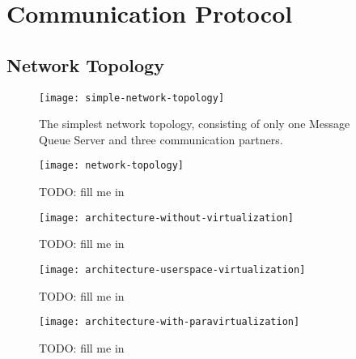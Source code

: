 \chapter{Communication Protocol}
\label{cha:comm-prot}

\section{Network Topology}
\label{sec:network-topology}

\begin{figure}
  \begin{center}
    \texttt{[image: simple-network-topology]}
  \end{center}
  \caption[Network  Topology   (simple)]{The  simplest  network  topology,
    consisting of  only one Message  Queue Server and  three communication
    partners.}
  \label{fig:simple-net-top}
\end{figure}

\begin{figure}
  \begin{center}
    \texttt{[image: network-topology]}
  \end{center}
  \caption[Network  Topology]{TODO: fill me in}
  \label{fig:net-top}
\end{figure}

\begin{figure}
  \begin{center}
    \texttt{[image: architecture-without-virtualization]}
  \end{center}
  \caption[No virtualization]{TODO: fill me in}
  \label{fig:arch-novirt}
\end{figure}

\begin{figure}
  \begin{center}
    \texttt{[image: architecture-userspace-virtualization]}
  \end{center}
  \caption[Virtualization in the user-space]{TODO: fill me in}
  \label{fig:arch-userspace-virt}
\end{figure}

\begin{figure}
  \begin{center}
    \texttt{[image: architecture-with-paravirtualization]}
  \end{center}
  \caption[Para-Virtualization architecture]{TODO: fill me in}
  \label{fig:arch-para-virt}
\end{figure}

